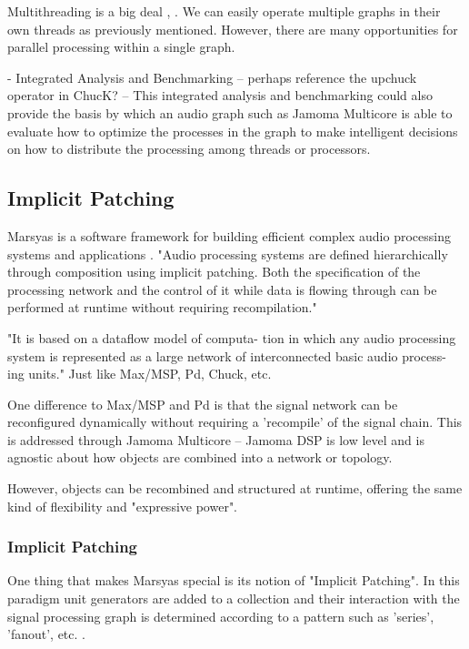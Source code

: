 \documentclass[twoside,a4paper]{article}
\begin{document}
Multithreading is a big deal \cite{asanovic2008parallel}, \cite{multicoreICMC08}.  We can easily operate multiple graphs in their own threads as previously mentioned.  However, there are many opportunities for parallel processing within a single graph.

- Integrated Analysis and Benchmarking -- perhaps reference the upchuck operator in ChucK?
   -- This integrated analysis and benchmarking could also provide the basis by which an audio graph such as Jamoma Multicore is able to evaluate how to optimize the processes in the graph to make intelligent decisions on how to distribute the processing among threads or processors.




\subsection{Implicit Patching} %

Marsyas is a software framework for building efficient complex audio processing systems and applications \cite{Tzanetakis:2008}. "Audio processing systems are defined hierarchically through composition using implicit patching. Both the specification of the processing network and the control of it while data is flowing through can be performed at runtime without requiring recompilation."

"It is based on a dataflow model of computa- tion in which any audio processing system is represented as a large network of interconnected basic audio process- ing units."  Just like Max/MSP, Pd, Chuck, etc.

One difference to Max/MSP and Pd is that the signal network can be reconfigured dynamically without requiring a 'recompile' of the signal chain.  This is addressed through Jamoma Multicore -- Jamoma DSP is low level and is agnostic about how objects are combined into a network or topology.

However, objects can be recombined and structured at runtime, offering the same kind of flexibility and "expressive power".

\subsubsection{Implicit Patching}

One thing that makes Marsyas special is its notion of "Implicit Patching".  In this paradigm unit generators are added to a collection and their interaction with the signal processing graph is determined according to a pattern such as 'series', 'fanout', etc. \cite{Bray:2005}.
\end{document}

